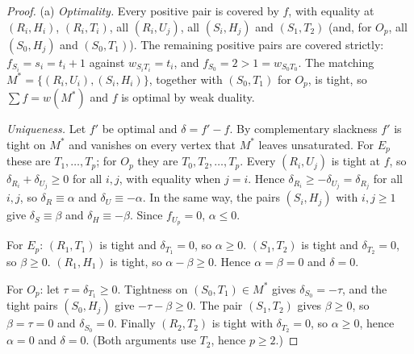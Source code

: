 \begin{proof}
(a) \emph{Optimality.} Every positive pair is covered by $f$, with equality at $(R_i,H_i)$,
$(R_i,T_i)$, all $(R_i,U_j)$, all $(S_i,H_j)$ and $(S_1,T_2)$ (and, for $O_p$, all $(S_0,H_j)$
and $(S_0,T_1)$). The remaining positive pairs are covered strictly:
$f_{S_i} = s_i = t_i+1$ against $w_{S_iT_i} = t_i$, and $f_{S_0} = 2 > 1 = w_{S_0T_0}$. The
matching $M^* = \{(R_i,U_i),(S_i,H_i)\}$, together with $(S_0,T_1)$ for $O_p$, is tight, so
$\sum f = w(M^*)$ and $f$ is optimal by weak duality.

\emph{Uniqueness.} Let $f'$ be optimal and $\delta = f'-f$. By complementary slackness $f'$ is
tight on $M^*$ and vanishes on every vertex that $M^*$ leaves unsaturated. For $E_p$ these are
$T_1,\dots,T_p$; for $O_p$ they are $T_0,T_2,\dots,T_p$. Every $(R_i,U_j)$ is tight at $f$, so
$\delta_{R_i}+\delta_{U_j} \ge 0$ for all $i, j$, with equality when $j = i$. Hence
$\delta_{R_i} \ge -\delta_{U_j} = \delta_{R_j}$ for all $i, j$, so $\delta_R \equiv \alpha$ and
$\delta_U \equiv -\alpha$. In the same way, the pairs $(S_i,H_j)$ with $i, j \ge 1$ give
$\delta_S \equiv \beta$ and $\delta_H \equiv -\beta$. Since $f_{U_p} = 0$, $\alpha \le 0$.

For $E_p$: $(R_1,T_1)$ is tight and $\delta_{T_1} = 0$, so $\alpha \ge 0$. $(S_1,T_2)$ is tight
and $\delta_{T_2} = 0$, so $\beta \ge 0$. $(R_1,H_1)$ is tight, so $\alpha-\beta \ge 0$. Hence
$\alpha = \beta = 0$ and $\delta = 0$.

For $O_p$: let $\tau = \delta_{T_1} \ge 0$. Tightness on $(S_0,T_1) \in M^*$ gives
$\delta_{S_0} = -\tau$, and the tight pairs $(S_0,H_j)$ give $-\tau-\beta \ge 0$. The pair
$(S_1,T_2)$ gives $\beta \ge 0$, so $\beta = \tau = 0$ and $\delta_{S_0} = 0$. Finally
$(R_2,T_2)$ is tight with $\delta_{T_2} = 0$, so $\alpha \ge 0$, hence $\alpha = 0$ and
$\delta = 0$. (Both arguments use $T_2$, hence $p \ge 2$.)


\end{proof}
